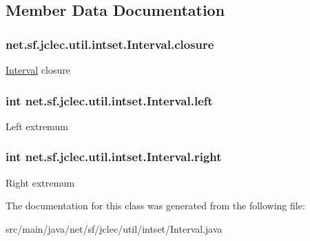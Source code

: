 \subsection{Member Data Documentation}
\hypertarget{classnet_1_1sf_1_1jclec_1_1util_1_1intset_1_1_interval_a82dbbcc9c60e4a4fed3df192dee33e4a}{
\subsubsection[{closure}]{ net.\-sf.\-jclec.\-util.\-intset.\-Interval.\-closure\hspace{0.3cm}{\ttfamily [protected]}}}\label{classnet_1_1sf_1_1jclec_1_1util_1_1intset_1_1_interval_a82dbbcc9c60e4a4fed3df192dee33e4a}
\hyperlink{classnet_1_1sf_1_1jclec_1_1util_1_1intset_1_1_interval}{Interval} closure \hypertarget{classnet_1_1sf_1_1jclec_1_1util_1_1intset_1_1_interval_a716d96af76f70841d335e5c00919ae3c}{
\subsubsection[{left}]{\setlength{\rightskip}{0pt plus 5cm}int net.\-sf.\-jclec.\-util.\-intset.\-Interval.\-left\hspace{0.3cm}{\ttfamily [protected]}}}\label{classnet_1_1sf_1_1jclec_1_1util_1_1intset_1_1_interval_a716d96af76f70841d335e5c00919ae3c}
Left extremum \hypertarget{classnet_1_1sf_1_1jclec_1_1util_1_1intset_1_1_interval_a01975c7f117b8f791551b9eaa7ba23c0}{
\subsubsection[{right}]{\setlength{\rightskip}{0pt plus 5cm}int net.\-sf.\-jclec.\-util.\-intset.\-Interval.\-right\hspace{0.3cm}{\ttfamily [protected]}}}\label{classnet_1_1sf_1_1jclec_1_1util_1_1intset_1_1_interval_a01975c7f117b8f791551b9eaa7ba23c0}
Right extremum 

The documentation for this class was generated from the following file\-:\begin{DoxyCompactItemize}
\item 
src/main/java/net/sf/jclec/util/intset/Interval.\-java\end{DoxyCompactItemize}

